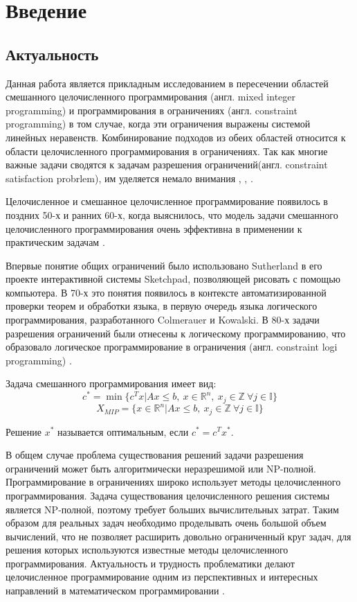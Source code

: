 \documentclass[a4paper,14pt,russian]{extreport}
\begin{document}
\newpage


\chapter{Введение}

\section{Актуальность}
Данная работа является прикладным исследованием в пересечении областей смешанного целочисленного программирования (англ. mixed integer programming) и программирования в ограничениях (англ. constraint programming) в том случае, когда эти ограничения выражены системой линейных неравенств. Комбинирование подходов из обеих областей относится к области целочисленного программирования в ограничениях. Так как многие важные задачи сводятся к задачам разрешения ограничений(англ. constraint satisfaction probrlem), им уделяется немало внимания \cite{dechter}, \cite{freuder}, \cite{tsang}. 
\par Целочисленное и смешанное целочисленное программирование появилось в поздних 50-х и ранних 60-х, когда выяснилось, что модель задачи смешанного целочисленного программирования очень эффективна в применении к практическим задачам \cite{markowitz_manne}.
\par Впервые понятие общих ограничений было использовано Sutherland\cite{sutherland} в его проекте интерактивной системы Sketchpad, позволяющей рисовать с помощью компьютера. В 70-х это понятия появилось в контексте автоматизированной проверки теорем и обработки языка, в первую очередь языка логического программирования, разработанного Colmerauer\cite{colmerauer}\cite{kanoui_pasero} и Kowalski\cite{kowalski}. В 80-х задачи разрешения ограничений были отнесены к логическому программированию, что образовало логическое программирование в ограничения (англ. constraint logi programming) \cite{jaffar_lassez}\cite{dincbas}\cite{colmerauer_2}.
\par Задача смешанного программирования имеет вид:
  $$c^* = \min\{c^Tx|Ax\le b,~ x\in \mathbb{R}^n,~ x_j\in\mathbb{Z}~ \forall j\in\mathbb{I}\}$$
  $$X_{MIP}=\{x\in\mathbb{R}^n|Ax\le b,~ x_j\in\mathbb{Z}~ \forall j\in\mathbb{I}\}$$
\par Решение $x^*$ называется оптимальным, если $c^* = c^Tx^*$.
\par В общем случае проблема существования решений задачи разрешения ограничений может быть алгоритмически неразрешимой или NP-полной. Программирование в ограничениях широко использует методы целочисленного программирования. Задача существования целочисленного решения системы является NP-полной, поэтому требует больших вычислительных затрат. Таким образом для реальных задач необходимо проделывать очень большой объем вычислений, что не позволяет расширить довольно ограниченный круг задач, для решения которых используются известные методы целочисленного программирования. Актуальность и трудность проблематики делают целочисленное программирование одним из перспективных и интересных направлений в математическом программировании \cite{karmanov}\cite {balinski}.
\end{document}
